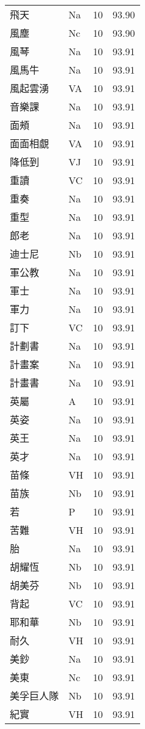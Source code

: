\documentclass[twocolumn]{book}
\begin{document}
\begin{supertabular}{llrr}
飛天 & Na & 10 &  93.90\\
風塵 & Nc & 10 &  93.90\\
風琴 & Na & 10 &  93.91\\
風馬牛 & Na & 10 &  93.91\\
風起雲湧 & VA & 10 &  93.91\\
音樂課 & Na & 10 &  93.91\\
面頰 & Na & 10 &  93.91\\
面面相覷 & VA & 10 &  93.91\\
降低到 & VJ & 10 &  93.91\\
重讀 & VC & 10 &  93.91\\
重奏 & Na & 10 &  93.91\\
重型 & Na & 10 &  93.91\\
郎老 & Na & 10 &  93.91\\
迪士尼 & Nb & 10 &  93.91\\
軍公教 & Na & 10 &  93.91\\
軍士 & Na & 10 &  93.91\\
軍力 & Na & 10 &  93.91\\
訂下 & VC & 10 &  93.91\\
計劃書 & Na & 10 &  93.91\\
計畫案 & Na & 10 &  93.91\\
計畫書 & Na & 10 &  93.91\\
英屬 & A & 10 &  93.91\\
英姿 & Na & 10 &  93.91\\
英王 & Na & 10 &  93.91\\
英才 & Na & 10 &  93.91\\
苗條 & VH & 10 &  93.91\\
苗族 & Nb & 10 &  93.91\\
若 & P & 10 &  93.91\\
苦難 & VH & 10 &  93.91\\
胎 & Na & 10 &  93.91\\
胡耀恆 & Nb & 10 &  93.91\\
胡美芬 & Nb & 10 &  93.91\\
背起 & VC & 10 &  93.91\\
耶和華 & Nb & 10 &  93.91\\
耐久 & VH & 10 &  93.91\\
美鈔 & Na & 10 &  93.91\\
美東 & Nc & 10 &  93.91\\
美孚巨人隊 & Nb & 10 &  93.91\\
紀實 & VH & 10 &  93.91\\

\end{supertabular}
\end{document}

